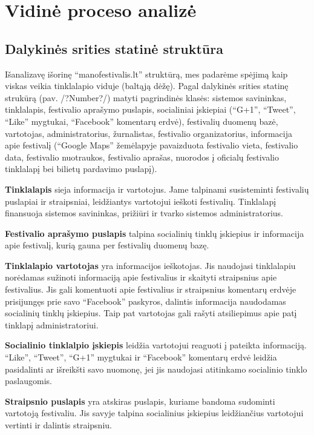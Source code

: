 \documentclass{VUMIFPSkursinis}
\begin{document}
\section{Vidinė proceso analizė}
\subsection {Dalykinės srities statinė struktūra}
Išanalizavę išorinę “manofestivalis.lt” struktūrą, mes padarėme spėjimą kaip viskas veikia tinklalapio viduje (baltąją dėžę).
Pagal dalykinės srities statinę strukūrą (pav. /?Number?/) matyti pagrindinės klasės: sistemos savininkas, tinklalapis, festivalio aprašymo puslapis,
 socialiniai įskiepiai (“G+1”, “Tweet”, “Like” mygtukai, “Facebook” komentarų erdvė), festivalių duomenų bazė, vartotojas, administratorius, žurnalistas, festivalio organizatorius,
 informacija apie festivalį (“Google Maps” žemėlapyje pavaizduota festivalio vieta, festivalio data, festivalio nuotraukos, festivalio aprašas, nuorodos į oficialų festivalio tinklalapį bei bilietų pardavimo puslapį). 

\textbf{Tinklalapis} sieja informacija ir vartotojus. Jame talpinami susisteminti festivalių puslapiai ir straipsniai, leidžiantys vartotojui ieškoti festivalių. Tinklalapį finansuoja sistemos savininkas, prižiūri ir tvarko sistemos administratorius.

\textbf{Festivalio aprašymo puslapis} talpina socialinių tinklų įskiepius ir informacija apie festivalį, kurią gauna per festivalių duomenų bazę.  

\textbf{Tinklalapio vartotojas} yra informacijos ieškotojas. Jis naudojasi tinklalapiu norėdamas sužinoti informaciją apie festivalius ir skaityti straipsnius apie festivalius. Jis gali komentuoti apie festivalius ir straipsnius komentarų erdvėje prisijungęs prie savo “Facebook” paskyros, dalintis informacija naudodamas socialinių tinklų įskiepius. Taip pat vartotojas gali rašyti atsiliepimus apie patį tinklapį administratoriui.

\textbf{Socialinio tinklalpio įskiepis} leidžia vartotojui reaguoti į pateikta informaciją. “Like”, “Tweet”, “G+1” mygtukai  ir “Facebook” komentarų erdvė leidžia pasidalinti ar išreikšti savo nuomonę, jei jis naudojasi atitinkamo socialinio tinklo paslaugomis.

\textbf{Straipsnio puslapis} yra atskiras puslapis, kuriame bandoma sudominti vartotoją festivaliu. Jis savyje talpina socialinius įskiepius leidžiančius vartotojui vertinti ir dalintis straipsniu.
\end{document}
